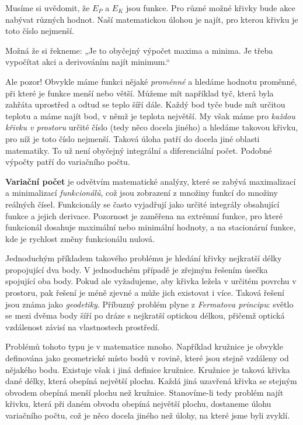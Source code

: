     Musíme si uvědomit, že \(E_P\) a \(E_K\) jsou funkce. Pro různé možné křivky bude akce nabývat
    různých hodnot. Naší matematickou úlohou je najít, pro kterou křivku je toto číslo nejmenší.

    Možná že si řekneme: „Je to obyčejný výpočet maxima a minima. Je třeba vypočítat akci a
    derivováním najít minimum.“

    Ale pozor! Obvykle máme funkci nějaké \emph{proměnné} a hledáme hodnotu proměnné, při které je
    funkce menší nebo větší. Můžeme mít například tyč, která byla zahřáta uprostřed a odtud se teplo
    šíří dále. Každý bod tyče bude mít určitou teplotu a máme najít bod, v němž je teplota největší.
    My však máme pro \emph{každou křivku v prostoru} určité číslo (tedy něco docela jiného) a
    hledáme takovou křivku, pro níž je toto číslo nejmenší. Taková úloha patří do docela jiné
    oblasti matematiky. To už není obyčejný integrální a diferenciální počet. Podobné výpočty patří
    do variačního počtu.
    
    \begin{tcnote}  
      \textbf{Variační počet} je odvětvím matematické analýzy, které se zabývá maximalizací a
      minimalizací \emph{funkcionálů}, což jsou zobrazení z množiny funkcí do množiny reálných
      čísel. Funkcionály se často vyjadřují jako určité integrály obsahující funkce a jejich
      derivace. Pozornost je zaměřena na extrémní funkce, pro které funkcionál dosahuje maximální
      nebo minimální hodnoty, a na stacionární funkce, kde je rychlost změny funkcionálu nulová.
  
      Jednoduchým příkladem takového problému je hledání křivky nejkratší délky propojující dva
      body. V jednoduchém případě je zřejmým řešením úsečka spojující oba body. Pokud ale
      vyžadujeme, aby křivka ležela v určitém povrchu v prostoru, pak řešení je méně zjevné a může
      jich existovat i více. Taková řešení jsou známa jako \emph{geodetiky}. Příbuzný problém plyne
      z \emph{Fermatova principu}: světlo se mezi dvěma body šíří po dráze s nejkratší optickou
      délkou, přičemž optická vzdálenost závisí na vlastnostech prostředí. 
      
      Problémů tohoto typu je v matematice mnoho. Například kružnice je obvykle definována jako
      geometrické místo bodů v rovině, které jsou stejně vzdáleny od nějakého bodu. Existuje však i
      jiná definice kružnice. Kružnice je taková křivka dané délky, která obepíná největší plochu.
      Každá jiná uzavřená křivka se stejným obvodem obepíná menší plochu než kružnice. Stanovíme-li
      tedy problém najít křivku, která při daném obvodu obepíná největší plochu, dostaneme úlohu
      variačního počtu, což je něco docela jiného než úlohy, na které jsme byli zvyklí.
    \end{tcnote}

